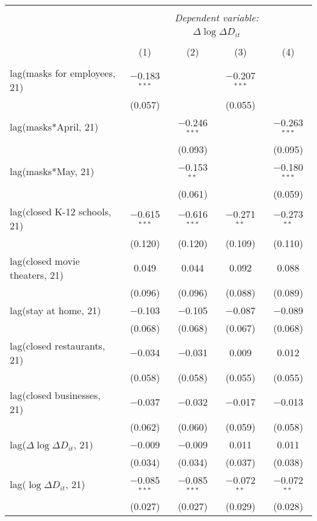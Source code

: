 \begin{tabular}{@{\extracolsep{1pt}}lcccc} 
\\[-1.8ex]\hline 
\hline \\[-1.8ex] 
 & \multicolumn{4}{c}{\textit{Dependent variable:}} \\ 
\cline{2-5} 
 & \multicolumn{4}{c}{$\Delta \log \Delta D_{it}$} \\ 
\\[-1.8ex] & (1) & (2) & (3) & (4)\\ 
\hline \\[-1.8ex] 
 lag(masks for employees, 21) & $-$0.183$^{***}$ &  & $-$0.207$^{***}$ &  \\ 
  & (0.057) &  & (0.055) &  \\ 
  lag(masks*April, 21) &  & $-$0.246$^{***}$ &  & $-$0.263$^{***}$ \\ 
  &  & (0.093) &  & (0.095) \\ 
  lag(masks*May, 21) &  & $-$0.153$^{**}$ &  & $-$0.180$^{***}$ \\ 
  &  & (0.061) &  & (0.059) \\ 
  lag(closed K-12 schools, 21) & $-$0.615$^{***}$ & $-$0.616$^{***}$ & $-$0.271$^{**}$ & $-$0.273$^{**}$ \\ 
  & (0.120) & (0.120) & (0.109) & (0.110) \\ 
  lag(closed movie theaters, 21) & 0.049 & 0.044 & 0.092 & 0.088 \\ 
  & (0.096) & (0.096) & (0.088) & (0.089) \\ 
  lag(stay at home, 21) & $-$0.103 & $-$0.105 & $-$0.087 & $-$0.089 \\ 
  & (0.068) & (0.068) & (0.067) & (0.068) \\ 
  lag(closed restaurants, 21) & $-$0.034 & $-$0.031 & 0.009 & 0.012 \\ 
  & (0.058) & (0.058) & (0.055) & (0.055) \\ 
  lag(closed businesses, 21) & $-$0.037 & $-$0.032 & $-$0.017 & $-$0.013 \\ 
  & (0.062) & (0.060) & (0.059) & (0.058) \\ 
  lag($\Delta \log \Delta D_{it}$, 21) & $-$0.009 & $-$0.009 & 0.011 & 0.011 \\ 
  & (0.034) & (0.034) & (0.037) & (0.038) \\ 
  lag($\log \Delta D_{it}$, 21) & $-$0.085$^{***}$ & $-$0.085$^{***}$ & $-$0.072$^{**}$ & $-$0.072$^{**}$ \\ 
  & (0.027) & (0.027) & (0.029) & (0.028) \\ 

\end{tabular}
